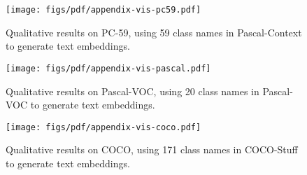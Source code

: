 \begin{figure}
\begin{center}
   \texttt{[image: figs/pdf/appendix-vis-pc59.pdf]}
\end{center}
   \caption{
   Qualitative results on PC-59, using 59 class names in Pascal-Context to generate text embeddings.
   }
\label{fig:vis-pc59}
\end{figure}


\begin{figure}
\begin{center}
   \texttt{[image: figs/pdf/appendix-vis-pascal.pdf]}
\end{center}
   \caption{
   Qualitative results on Pascal-VOC, using 20 class names in Pascal-VOC to generate text embeddings.
   }
\label{fig:vis-p20}
\end{figure}


\begin{figure}
\begin{center}
   \texttt{[image: figs/pdf/appendix-vis-coco.pdf]}
\end{center}
   \caption{
   Qualitative results on COCO, using 171 class names in COCO-Stuff to generate text embeddings.
   }
\label{fig:vis-coco}
\end{figure}

